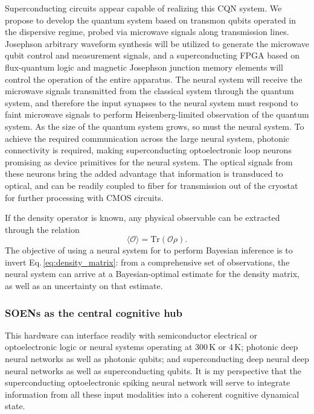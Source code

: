 Superconducting circuits appear capable of realizing this CQN system. We propose to develop the quantum system based on transmon qubits operated in the dispersive regime, probed via microwave signals along transmission lines. Josephson arbitrary waveform synthesis will be utilized to generate the microwave qubit control and measurement signals, and a superconducting FPGA based on flux-quantum logic and magnetic Josephson junction memory elements will control the operation of the entire apparatus. The neural system will receive the microwave signals transmitted from the classical system through the quantum system, and therefore the input synapses to the neural system must respond to faint microwave signals to perform Heisenberg-limited observation of the quantum system. As the size of the quantum system grows, so must the neural system. To achieve the required communication across the large neural system, photonic connectivity is required, making superconducting optoelectronic loop neurons \cite{sh2018_full} promising as device primitives for the neural system. The optical signals from these neurons bring the added advantage that information is transduced to optical, and can be readily coupled to fiber for transmission out of the cryostat for further processing with CMOS circuits.

\vspace{3em}
If the density operator is known, any physical observable can be extracted through the relation
\begin{equation}
\label{eq:density_matrix}
\langle \mathcal{O}\rangle = \mathrm{Tr}(\mathcal{O}\rho).
\end{equation}
The objective of using a neural system for to perform Bayesian inference is to invert Eq.\,\ref{eq:density_matrix}: from a comprehensive set of observations, the neural system can arrive at a Bayesian-optimal estimate for the density matrix, as well as an uncertainty on that estimate.

\subsubsection{SOENs as the central cognitive hub}
This hardware can interface readily with semiconductor electrical or optoelectronic logic or neural systems operating at 300\,K or 4\,K; photonic deep neural networks as well as photonic qubits; and superconducting deep neural deep neural networks as well as superconducting qubits. It is my perspective that the superconducting optoelectronic spiking neural network will serve to integrate information from all these input modalities into a coherent cognitive dynamical state. 

